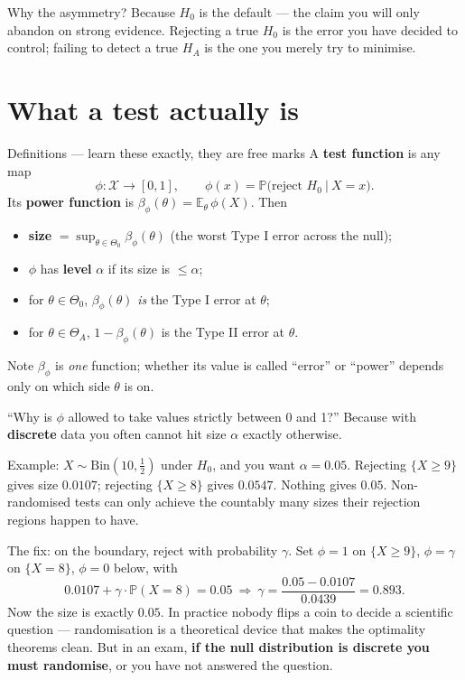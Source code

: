 \documentclass[11pt]{article}
\newcommand{\E}{\mathbb{E}}
\newcommand{\Prob}{\mathbb{P}}
\begin{document}
Why the asymmetry? Because $H_0$ is the default --- the claim you will only abandon on strong
evidence. Rejecting a true $H_0$ is the error you have decided to control; failing to detect a
true $H_A$ is the one you merely try to minimise.

\section{What a test actually is}

\begin{idea}{Definitions --- learn these exactly, they are free marks}
A \textbf{test function} is any map
\[
\phi:\mathcal X\to[0,1],\qquad
\phi(x)=\Prob\big(\text{reject }H_0\ \big|\ X=x\big).
\]
Its \textbf{power function} is $\beta_\phi(\theta)=\E_\theta\,\phi(X)$. Then
\begin{itemize}
\item \textbf{size} $=\displaystyle\sup_{\theta\in\Theta_0}\beta_\phi(\theta)$
\quad(the worst Type I error across the null);
\item $\phi$ has \textbf{level} $\alpha$ if its size is $\le\alpha$;
\item for $\theta\in\Theta_0$, $\beta_\phi(\theta)$ \emph{is} the Type I error at $\theta$;
\item for $\theta\in\Theta_A$, $1-\beta_\phi(\theta)$ is the Type II error at $\theta$.
\end{itemize}
Note $\beta_\phi$ is \emph{one} function; whether its value is called ``error'' or ``power''
depends only on which side $\theta$ is on.
\end{idea}

\begin{confusion}{``Why is $\phi$ allowed to take values strictly between 0 and 1?''}
Because with \textbf{discrete} data you often cannot hit size $\alpha$ exactly otherwise.

Example: $X\sim\mathrm{Bin}(10,\tfrac12)$ under $H_0$, and you want $\alpha=0.05$. Rejecting
$\{X\ge9\}$ gives size $0.0107$; rejecting $\{X\ge8\}$ gives $0.0547$. Nothing gives $0.05$.
Non-randomised tests can only achieve the countably many sizes their rejection regions happen
to have.

The fix: on the boundary, reject with probability $\gamma$. Set
$\phi=1$ on $\{X\ge9\}$, $\phi=\gamma$ on $\{X=8\}$, $\phi=0$ below, with
\[
0.0107+\gamma\cdot\Prob(X=8)=0.05\ \Longrightarrow\ \gamma=\frac{0.05-0.0107}{0.0439}=0.893 .
\]
Now the size is exactly $0.05$. In practice nobody flips a coin to decide a scientific
question --- randomisation is a theoretical device that makes the optimality theorems clean.
But in an exam, \textbf{if the null distribution is discrete you must randomise}, or you have
not answered the question.
\end{confusion}
\end{document}
